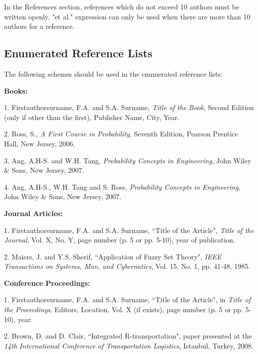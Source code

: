 \documentclass[a4paper,oneside,12pt]{report}
\numberwithin{equation}{chapter}
\begin{document}
In the References section, references which do not exceed 10 authors must be written openly. "et al." expression can only be used when there are more than 10 authors for a reference.


\subsection{Enumerated Reference Lists}

The following schemes should be used in the enumerated reference lists: 

\begin{flushleft}

\leftskip 5mm \parindent -5mm \textbf{Books:}

\leftskip 5mm \parindent -5mm 1. Firstauthorsurname, F.A. and S.A. Surname, \textit{Title of the Book}, Second Edition (only if other than the first), Publisher Name, City, Year.

\leftskip 5mm \parindent -5mm 2. Ross, S., \textit{A First Course in Probability}, Seventh Edition, Pearson Prentice Hall, New Jersey, 2006.

\leftskip 5mm \parindent -5mm 3. Ang, A.H-S. and W.H. Tang, \textit{Probability Concepts in Engineering}, John Wiley \& Sons, New Jersey, 2007.

\leftskip 5mm \parindent -5mm 4. Ang, A.H-S., W.H. Tang and S. Ross, \textit{Probability Concepts in Engineering}, John Wiley \& Sons, New Jersey, 2007.\newline


\leftskip 5mm \parindent -5mm \textbf{Journal Articles:}

\leftskip 5mm \parindent -5mm 1. Firstauthorsurname, F.A. and S.A. Surname, ``Title of the Article", \textit{Title of the Journal}, Vol. X, No. Y, page number (p. 5 or pp. 5-10), year of publication.

\leftskip 5mm \parindent -5mm 2. Maiers, J. and Y.S. Sherif, ``Application of Fuzzy Set Theory", \textit{IEEE Transactions on Systems, Man, and Cybernatics}, Vol. 15, No. 1, pp. 41-48, 1985.\newline


\leftskip 5mm \parindent -5mm \textbf{Conference Proceedings:}

\leftskip 5mm \parindent -5mm 1. Firstauthorsurname, F.A. and S.A. Surname, ``Title of the Article", in \textit{Title of the Proceedings}, Editors, Location, Vol. X (if exists), page number (p. 5 or pp. 5-10), year.

\leftskip 5mm \parindent -5mm 2. Brown, D. and D. Clair, ``Integrated R-transportation", paper presented at the \textit{14th International Conference of Transportation Logistics}, Istanbul, Turkey, 2008.\newline


\end{flushleft}
\end{document}
